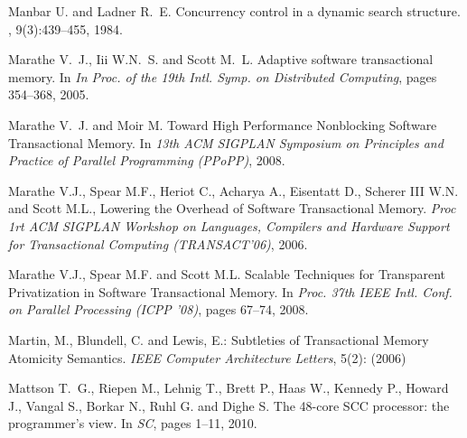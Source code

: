 \begin{thebibliography}{99}
{
Manbar U. and Ladner R.~E.
\newblock Concurrency control in a dynamic search structure.
, 9(3):439--455, 1984.






Marathe V.~J., Iii W.N.~S. and  Scott M.~L.
\newblock Adaptive software transactional memory.
\newblock In {\em In Proc. of the 19th Intl. Symp. on Distributed Computing},
  pages 354--368, 2005.

Marathe V.~J. and Moir M.
Toward High Performance Nonblocking Software Transactional Memory. 
In {\em 13th ACM SIGPLAN Symposium on Principles and Practice of Parallel Programming (PPoPP)}, 2008.


Marathe  V.J.,  Spear M.F., Heriot  C., Acharya A., Eisentatt  D., Scherer
III W.N. and Scott M.L.,
Lowering the Overhead of Software Transactional Memory. 
{\it  Proc 1rt  ACM SIGPLAN  Workshop on  Languages, Compilers  and Hardware
Support for Transactional Computing (TRANSACT'06)}, 2006. 


Marathe V.J., Spear M.F. and Scott M.L.
\newblock Scalable Techniques for Transparent Privatization in Software Transactional Memory.
\newblock In {\em Proc. 37th IEEE Intl. Conf. on Parallel Processing (ICPP '08)}, pages 67--74, 2008.





 Martin, M.,  Blundell, C. and Lewis, E.:
 Subtleties of Transactional Memory Atomicity Semantics. 
{\it IEEE Computer Architecture  Letters},  5(2):  (2006)



Mattson T.~G., Riepen M., Lehnig T., Brett P., Haas W., Kennedy P., Howard J.,
  Vangal S., Borkar N., Ruhl G. and Dighe S.
\newblock The 48-core {SCC} processor: the programmer's view.
\newblock In {\em SC}, pages 1--11, 2010.


}
\end{thebibliography}
